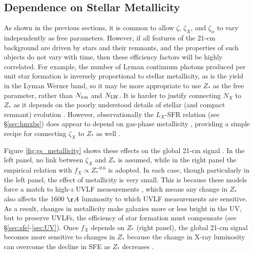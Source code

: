 \subsection{Dependence on Stellar Metallicity}
As shown in the previous sections, it is common to allow $\zeta$, $\zeta_X$, and $\zeta_{\alpha}$ to vary independently as free parameters. However, if all features of the 21-cm background are driven by stars and their remnants, and the properties of such objects do not vary with time, then these efficiency factors will be highly correlated. For example, the number of Lyman continuum photons produced per unit star formation is inversely proportional to stellar metallicity, as is the yield in the Lyman Werner band, so it may be more appropriate to use $Z_{\ast}$ as the free parameter, rather than $N_{\text{ion}}$ and $N_{\text{LW}}$. It is harder to justify connecting $N_X$ to $Z_{\ast}$ as it depends on the poorly understood details of stellar (and compact remnant) evolution \cite{Belczynski2002}. However, observationally the $L_X$-SFR relation (see \S\ref{sec:hmxbs}) does appear to depend on gas-phase metallicity \cite{Brorby2016}, providing a simple recipe for connecting $\zeta_X$ to $Z_{\ast}$ as well \cite{Mirocha2017}.

Figure \ref{fig:gs_metallicity} shows these effects on the global 21-cm signal \cite{Mirocha2017}. In the left panel, no link between $\zeta_X$ and $Z_{\ast}$ is assumed, while in the right panel the empirical relation with $f_X \propto Z_{\ast}^{-0.6}$ is adopted. In each case, though particularly in the left panel, the effect of metallicity is very small. This is because these models force a match to high-$z$ UVLF measurements \cite{Bouwens2015,Finkelstein2015}, which means any change in $Z_{\ast}$ also affects the 1600 $\AA$ luminosity to which UVLF measurements are sensitive. As a result, changes in metallicity make galaxies more or less bright in the UV, but to preserve UVLFs, the efficiency of star formation must compensate (see \S\ref{sec:sfe}-\ref{sec:UV}). Once $f_X$ depends on $Z_{\ast}$ (right panel), the global 21-cm signal becomes more sensitive to changes in $Z_{\ast}$ because the change in X-ray luminosity can overcome the decline in SFE as $Z_{\ast}$ decreases \cite{Mirocha2017}.

